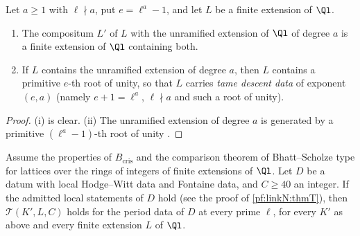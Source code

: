 \begin{lemma}[Coefficients]\label{pf:linkN:tamecoeff}
Let $a\ge1$ with $\ell\nmid a$, put $e=\ell^a-1$, and let $L$ be a finite extension of $\Ql$.
\begin{enumerate}[label=(\roman*)]
\item The compositum $L'$ of $L$ with the unramified extension of $\Ql$ of degree $a$ is a finite extension of $\Ql$ containing both.
\item If $L$ contains the unramified extension of degree $a$, then $L$ contains a primitive $e$-th root of unity, so that $L$ carries
\emph{tame descent data} of exponent $(e,a)$ (namely $e+1=\ell^a$, $\ell\nmid a$ and such a root of unity).
\end{enumerate}
\end{lemma}

\begin{proof}
(i) is clear. (ii) The unramified extension of degree $a$ is generated by a primitive $(\ell^a-1)$-th root of unity
\cite[Ch.~II, \S7]{Neukirch1999}.
\end{proof}

\begin{proposition}\label{pf:linkN:liftstep}
Assume the properties of $B_{\mathrm{cris}}$ and the comparison theorem of Bhatt--Scholze type for lattices over the rings of integers of finite
extensions of $\Ql$. Let $D$ be a datum with local Hodge--Witt data and Fontaine data, and $C\ge40$ an integer. If the admitted local statements
of $D$ hold (see the proof of \cref{pf:linkN:thmT}), then $\mathcal T(K',L,C)$ holds for the period data of $D$ at every prime $\ell$, for every
$K'$ as above and every finite extension $L$ of $\Ql$.
\end{proposition}

